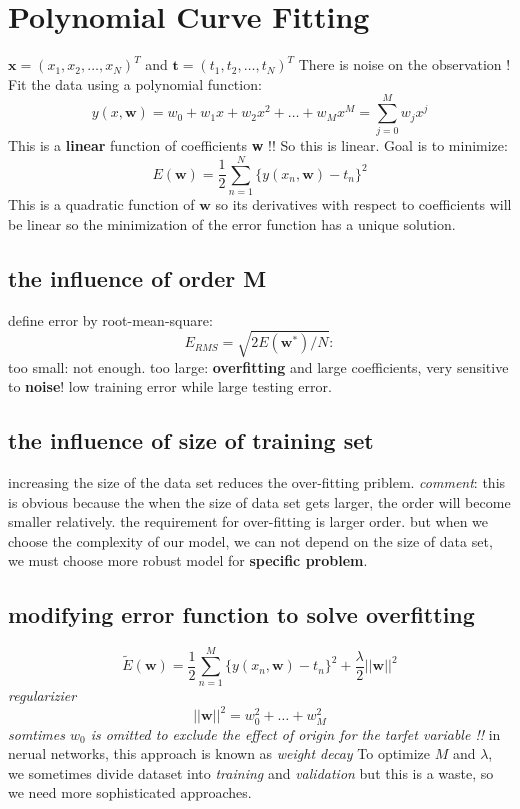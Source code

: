 \documentclass[a4paper]{book}
\newcommand{\mbf}{\mathbf}
\newcommand{\ww}{\mbf w}
\begin{document}
\section{Polynomial Curve Fitting}
$\textbf{x} = (x_1,x_2,\dots, x_N)^T $ and $\textbf{t} =(t_1,t_2, \dots, t_N)^T$
There is noise on the observation !\newline
Fit the data using a polynomial function:
$$y(x, \textbf{w}) = w_0+w_1x+w_2x^2+\dots+w_Mx^M=\sum_{j=0}^Mw_jx^j$$
This is a \textbf{linear} function of coefficients \textbf{w}  !! So this is linear.\newline
Goal is to minimize:
$$E(\textbf{w}) = \frac12\sum_{n=1}^N\{y(x_n,\textbf{w})-t_n\}^2$$
This is a quadratic function of $\ww$ so its derivatives with respect to coefficients will be linear so the minimization of the error function has a unique solution.
\subsection{the influence of order M}
define error by root-mean-square:
\begin{equation}\label{2.3}
E_{RMS} = \sqrt{2E(\textbf{w}^*)/N}:
\end{equation}
too small: not enough.\newline
too large: \textbf{overfitting} and large coefficients, very sensitive to \textbf{noise}! low training error while large testing error.
\subsection{the influence of size of training set}
increasing the size of the data set reduces the over-fitting priblem.\newline
\textit{comment}: this is obvious because the when the size of data set gets larger, the order will become smaller relatively. the requirement for over-fitting is larger order. but when we choose the complexity of our model, we can not depend on the size of data set, we must choose more robust model for \textbf{specific problem}.
\subsection{modifying error function to solve overfitting}
\begin{equation}\label{2.4}
\tilde{E}(\textbf{w}) = \frac12\sum_{n=1}^M\{y(x_n,\textbf{w})-t_n\}^2+\frac{\lambda}{2}||\textbf{w}||^2
\end{equation}
\textit{regularizier} $$||\textbf{w}||^2 = w_0^2+\dots+w_M^2$$
\textit
{somtimes $w_0$ is omitted to exclude the effect of origin for the tarfet variable !!}
in nerual networks, this approach is known as \textit{weight decay}
To optimize $M$ and $\lambda$, we sometimes divide dataset into \textit{training} and \textit{validation} but this is a waste, so we need more sophisticated approaches.
\end{document}
